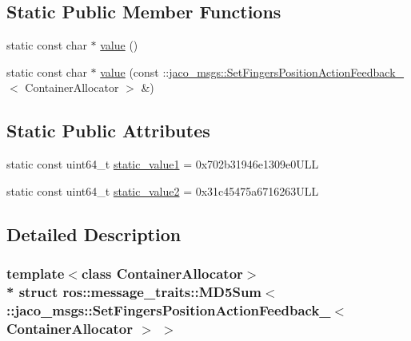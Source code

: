 \subsection*{Static Public Member Functions}
\begin{DoxyCompactItemize}
\item 
static const char $\ast$ \hyperlink{structros_1_1message__traits_1_1MD5Sum_3_01_1_1jaco__msgs_1_1SetFingersPositionActionFeedback___dfd49ff210ac61d84c4dc5e7681b49fc_a556323196014ab47bbda3358a1fd08e7}{value} ()
\item 
static const char $\ast$ \hyperlink{structros_1_1message__traits_1_1MD5Sum_3_01_1_1jaco__msgs_1_1SetFingersPositionActionFeedback___dfd49ff210ac61d84c4dc5e7681b49fc_a7241bbecfccf265b02176f8d62d6f9d6}{value} (const \+::\hyperlink{structjaco__msgs_1_1SetFingersPositionActionFeedback__}{jaco\+\_\+msgs\+::\+Set\+Fingers\+Position\+Action\+Feedback\+\_\+}$<$ Container\+Allocator $>$ \&)
\end{DoxyCompactItemize}
\subsection*{Static Public Attributes}
\begin{DoxyCompactItemize}
\item 
static const uint64\+\_\+t \hyperlink{structros_1_1message__traits_1_1MD5Sum_3_01_1_1jaco__msgs_1_1SetFingersPositionActionFeedback___dfd49ff210ac61d84c4dc5e7681b49fc_ad30e05babb5ea67a6d3c6a13725afe39}{static\+\_\+value1} = 0x702b31946e1309e0\+U\+LL
\item 
static const uint64\+\_\+t \hyperlink{structros_1_1message__traits_1_1MD5Sum_3_01_1_1jaco__msgs_1_1SetFingersPositionActionFeedback___dfd49ff210ac61d84c4dc5e7681b49fc_a4eecf114c86cd5b9f91c48d9d1ae3a7b}{static\+\_\+value2} = 0x31c45475a6716263\+U\+LL
\end{DoxyCompactItemize}


\subsection{Detailed Description}
\subsubsection*{template$<$class Container\+Allocator$>$\\*
struct ros\+::message\+\_\+traits\+::\+M\+D5\+Sum$<$ \+::jaco\+\_\+msgs\+::\+Set\+Fingers\+Position\+Action\+Feedback\+\_\+$<$ Container\+Allocator $>$ $>$}



